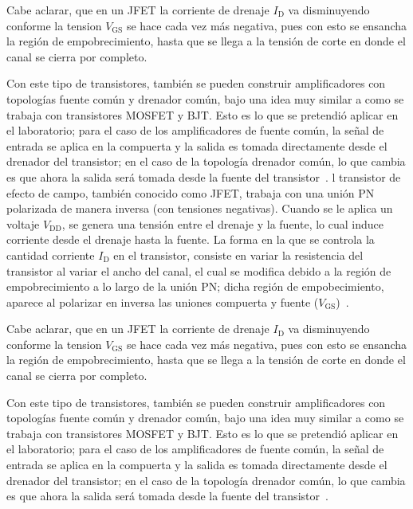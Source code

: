 \documentclass[journal]{IEEEtran}
\begin{document}
Cabe aclarar, que en un JFET la corriente de drenaje $I_{\text{D}}$ va disminuyendo conforme la tension $V_{\text{GS}}$ se
hace cada vez más negativa, pues con esto se ensancha la región de empobrecimiento, hasta que se llega a la tensión 
de corte en donde el canal se cierra por completo.

Con este tipo de transistores, también se pueden construir amplificadores con topologías fuente común y 
drenador común, bajo una idea muy similar a como se trabaja con transistores MOSFET y BJT. Esto es lo que se pretendió 
aplicar en el laboratorio; para el caso de los amplificadores de fuente común, la señal de entrada se aplica en la compuerta
y la salida es tomada directamente desde el drenador del transistor; en el caso de la topología drenador común, lo que cambia
es que ahora la salida será tomada desde la fuente del transistor~\cite{Floyd}.
l transistor de efecto de campo, también conocido como JFET, trabaja con una unión PN
polarizada de manera inversa (con tensiones negativas). Cuando se le aplica un voltaje $V_{\text{DD}}$, se genera 
una tensión entre el drenaje y la fuente, lo cual induce corriente desde el drenaje hasta la fuente. La forma en la 
que se controla la cantidad corriente $I_{\text{D}}$ en el transistor, consiste en variar la resistencia del transistor
al variar el ancho del canal, el cual se modifica debido a la región de empobrecimiento a lo largo de la unión PN;
dicha región de empobecimiento, aparece al polarizar en inversa las uniones compuerta y fuente ($V_{\text{GS}}$)~\cite{Floyd}.

Cabe aclarar, que en un JFET la corriente de drenaje $I_{\text{D}}$ va disminuyendo conforme la tension $V_{\text{GS}}$ se
hace cada vez más negativa, pues con esto se ensancha la región de empobrecimiento, hasta que se llega a la tensión 
de corte en donde el canal se cierra por completo.

Con este tipo de transistores, también se pueden construir amplificadores con topologías fuente común y 
drenador común, bajo una idea muy similar a como se trabaja con transistores MOSFET y BJT. Esto es lo que se pretendió 
aplicar en el laboratorio; para el caso de los amplificadores de fuente común, la señal de entrada se aplica en la compuerta
y la salida es tomada directamente desde el drenador del transistor; en el caso de la topología drenador común, lo que cambia
es que ahora la salida será tomada desde la fuente del transistor~\cite{Floyd}.

\end{document}
